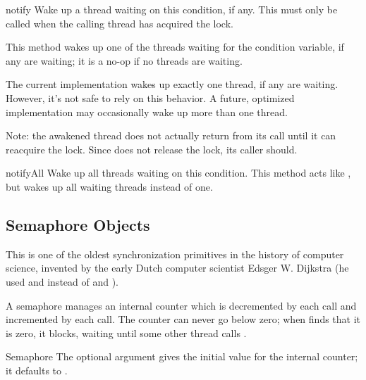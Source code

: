 \begin{methoddesc}{notify}{}
Wake up a thread waiting on this condition, if any.
This must only be called when the calling thread has acquired the
lock.

This method wakes up one of the threads waiting for the condition
variable, if any are waiting; it is a no-op if no threads are waiting.

The current implementation wakes up exactly one thread, if any are
waiting.  However, it's not safe to rely on this behavior.  A future,
optimized implementation may occasionally wake up more than one
thread.

Note: the awakened thread does not actually return from its
 call until it can reacquire the lock.  Since
 does not release the lock, its caller should.
\end{methoddesc}

\begin{methoddesc}{notifyAll}{}
Wake up all threads waiting on this condition.  This method acts like
, but wakes up all waiting threads instead of one.
\end{methoddesc}


\subsection{Semaphore Objects \label{semaphore-objects}}

This is one of the oldest synchronization primitives in the history of
computer science, invented by the early Dutch computer scientist
Edsger W. Dijkstra (he used  and  instead of
 and ).

A semaphore manages an internal counter which is decremented by each
 call and incremented by each 
call.  The counter can never go below zero; when 
finds that it is zero, it blocks, waiting until some other thread
calls .

\begin{classdesc}{Semaphore}{}
The optional argument gives the initial value for the internal
counter; it defaults to .
\end{classdesc}

